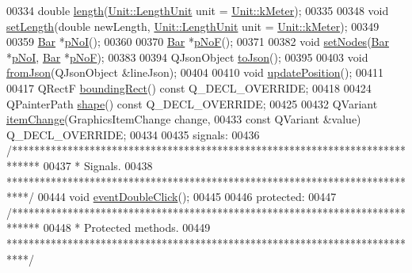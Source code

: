 \begin{DoxyCode}
00334   \textcolor{keywordtype}{double} \hyperlink{group___models_gae2e4500d0fa60dcc2ecb08b2c96954f9}{length}(\hyperlink{class_unit_a8c8921f7b225ad6063b1cb573425b9a0}{Unit::LengthUnit} unit = \hyperlink{class_unit_a8c8921f7b225ad6063b1cb573425b9a0abfa41ebe7ee649a1f02c9b8ae570434b}{Unit::kMeter});
00335 
00348   \textcolor{keywordtype}{void} \hyperlink{group___models_ga950d0b8f5d167eda430c65ca7adadbb0}{setLength}(\textcolor{keywordtype}{double} newLength, \hyperlink{class_unit_a8c8921f7b225ad6063b1cb573425b9a0}{Unit::LengthUnit} unit = 
      \hyperlink{class_unit_a8c8921f7b225ad6063b1cb573425b9a0abfa41ebe7ee649a1f02c9b8ae570434b}{Unit::kMeter});
00349 
00359   \hyperlink{class_bar}{Bar} *\hyperlink{group___models_gaeafd90e84ac2f8de2a879abe9e53eef3}{pNoI}();
00360 
00370   \hyperlink{class_bar}{Bar} *\hyperlink{group___models_gabbc73ddedd3075c33ae5331bd7c9829f}{pNoF}();
00371 
00382   \textcolor{keywordtype}{void} \hyperlink{group___models_gaeeab146e6c1d7d1a688a2764a9c9a170}{setNodes}(\hyperlink{class_bar}{Bar} *\hyperlink{group___models_gaeafd90e84ac2f8de2a879abe9e53eef3}{pNoI}, \hyperlink{class_bar}{Bar} *\hyperlink{group___models_gabbc73ddedd3075c33ae5331bd7c9829f}{pNoF});
00383 
00394   QJsonObject \hyperlink{group___models_ga4effa7a96db465ea6e01135d5a010739}{toJson}();
00395 
00403   \textcolor{keywordtype}{void} \hyperlink{group___models_ga62623ad71df5279377cc69da90decc75}{fromJson}(QJsonObject &lineJson);
00404 
00410   \textcolor{keywordtype}{void} \hyperlink{group___models_ga8fdb12651d4bc592616d241386b066b3}{updatePosition}();
00411 
00417   QRectF \hyperlink{group___models_gad15c3af158d3b966c04be7e18cee5aea}{boundingRect}() const Q\_DECL\_OVERRIDE;
00418 
00424   QPainterPath \hyperlink{group___models_gaf1736b829a643d99052ef6428ddd5b16}{shape}() const Q\_DECL\_OVERRIDE;
00425 
00432   QVariant \hyperlink{group___models_ga5fcee3f23eb50e34f730d602a3802b93}{itemChange}(GraphicsItemChange change,
00433                       const QVariant &value) Q\_DECL\_OVERRIDE;
00434 
00435 signals:
00436   \textcolor{comment}{/*****************************************************************************}
00437 \textcolor{comment}{   * Signals.}
00438 \textcolor{comment}{   ****************************************************************************/}
00444   \textcolor{keywordtype}{void} \hyperlink{class_line_a2444b577ea2254994599c6f829c629a5}{eventDoubleClick}();
00445 
00446 protected:
00447   \textcolor{comment}{/*****************************************************************************}
00448 \textcolor{comment}{   * Protected methods.}
00449 \textcolor{comment}{   ****************************************************************************/}

\end{DoxyCode}
